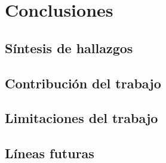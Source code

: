 \section{Conclusiones}\label{sec:conclusiones}

\subsection{Síntesis de hallazgos}
\label{sec:sintesis-hallazgos}
\begin{pendiente}
\end{pendiente}

\subsection{Contribución del trabajo}
\label{sec:contribucion}
\begin{pendiente}
\end{pendiente}

\subsection{Limitaciones del trabajo}
\label{sec:limitaciones}
\begin{pendiente}
\end{pendiente}

\subsection{Líneas futuras}
\label{sec:lineas-futuras}
\begin{pendiente}
\end{pendiente}
